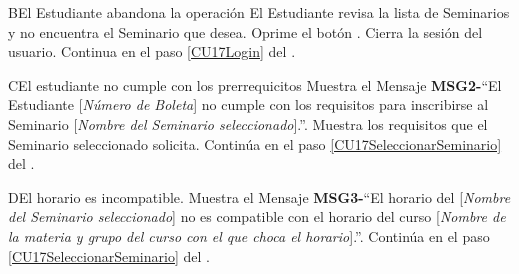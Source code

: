 \begin{UCtrayectoriaA}{B}{El Estudiante abandona la operación}
	\UCpaso El Estudiante revisa la lista de Seminarios y no encuentra el Seminario que desea.
	\UCpaso[\UCactor] Oprime el botón .
	\UCpaso Cierra la sesión del usuario.
	\UCpaso Continua en el paso \ref{CU17Login} del .
\end{UCtrayectoriaA}

\begin{UCtrayectoriaA}{C}{El estudiante no cumple con los prerrequicitos}
	\UCpaso Muestra el Mensaje {\bf MSG2-}``El Estudiante [{\em Número de Boleta}] no cumple con los requisitos para inscribirse al Seminario [{\em Nombre del Seminario seleccionado}].''.
	\UCpaso Muestra los requisitos que el Seminario seleccionado solicita.
	\UCpaso Continúa en el paso \ref{CU17SeleccionarSeminario} del .
\end{UCtrayectoriaA}

\begin{UCtrayectoriaA}{D}{El horario es incompatible.}
	\UCpaso Muestra el Mensaje {\bf MSG3-}``El horario del [{\em Nombre del Seminario seleccionado}] no es compatible con el horario del curso [{\em Nombre de la materia y grupo del curso con el que choca el horario}].''.
	\UCpaso Continúa en el paso \ref{CU17SeleccionarSeminario} del .
\end{UCtrayectoriaA}
		
